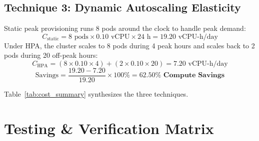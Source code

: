 \documentclass[conference]{IEEEtran}
\begin{document}
\subsection{Technique 3: Dynamic Autoscaling Elasticity}
Static peak provisioning runs 8 pods around the clock to handle peak demand:
\begin{equation}
C_{\text{static}} = 8 \text{ pods} \times 0.10 \text{ vCPU} \times 24 \text{ h} = 19.20 \text{ vCPU-h/day}
\end{equation}
Under HPA, the cluster scales to 8 pods during 4 peak hours and scales back to 2 pods during 20 off-peak hours:
\begin{equation}
C_{\text{HPA}} = (8 \times 0.10 \times 4) + (2 \times 0.10 \times 20) = 7.20 \text{ vCPU-h/day}
\end{equation}
\begin{equation}
\text{Savings} = \frac{19.20 - 7.20}{19.20} \times 100\% = \mathbf{62.50\% \text{ Compute Savings}}
\end{equation}

Table~\ref{tab:cost_summary} synthesizes the three techniques.

\begin{table}[htbp]
\centering
\caption{Comprehensive Cost Optimization Results}
\label{tab:cost_summary}
\end{table}

\section{Testing \& Verification Matrix}
\end{document}

